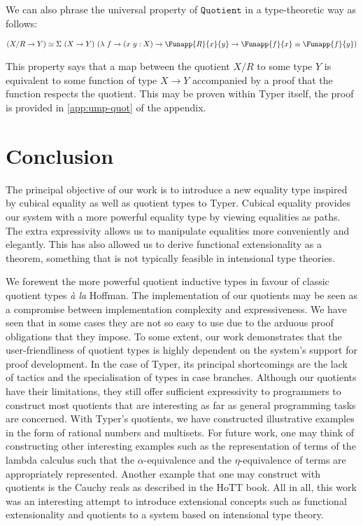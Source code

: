\documentclass[12pt,twoside,maitrise]{dms}
\theoremstyle{definition}
\numberwithin{equation}{section}
\numberwithin{table}{chapter}
\numberwithin{figure}{chapter}
\newcommand\id[1] {\texttt{#1}}
\newcommand\latinphrase{\textit}
\begin{document}
We can also phrase the universal property of $\id{Quotient}$ in a type-theoretic
way as follows:

\begin{align*}
  & (X/R \rightarrow Y) \simeq \Sigma \ (X \rightarrow Y) \ (\lambda \ f \rightarrow (x \ y : X) \rightarrow \Funapp{R}{x}{y} \rightarrow \Funapp{f}{x} \equiv \Funapp{f}{y}) \\
\end{align*}

This property says that a map between the quotient $X / R$ to some type $Y$ is
equivalent to some function of type $X \rightarrow Y$ accompanied by a
proof that the function respects the quotient. This may be proven within Typer
itself, the proof is provided in \autoref{app:ump-quot} of the appendix.

\chapter{Conclusion}

The principal objective of our work is to introduce a new equality type inspired
by cubical equality as well as quotient types to Typer. Cubical equality
provides our system with a more powerful equality type by viewing equalities as
paths. The extra expressivity allows us to manipulate equalities more
conveniently and elegantly. This has also allowed us to derive functional
extensionality as a theorem, something that is not typically feasible in
intensional type theories.

We forewent the more powerful quotient inductive types in favour of classic
quotient types \latinphrase{à la} Hoffman. The implementation of our quotients
may be seen as a compromise between implementation complexity and
expressiveness. We have seen that in some cases they are not so easy to use due
to the arduous proof obligations that they impose. To some extent, our work
demonstrates that the user-friendliness of quotient types is highly dependent on
the system's support for proof development. In the case of Typer, its principal
shortcomings are the lack of tactics and the specialisation of types in case
branches. Although our quotients have their limitations, they still offer
sufficient expressivity to programmers to construct most quotients that are
interesting as far as general programming tasks are concerned. With Typer's
quotients, we have constructed illustrative examples in the form of rational
numbers and multisets. For future work, one may think of constructing other
interesting examples such as the representation of terms of the lambda calculus
such that the $\alpha$-equivalence and the $\eta$-equivalence of terms are
appropriately represented. Another example that one may construct with quotients
is the Cauchy reals as described in the HoTT book\cite[Chap. 11.3.1]{HoTTbook}.
All in all, this work was an interesting attempt to introduce extensional
concepts such as functional extensionality and quotients to a system based on
intensional type theory.
\end{document}
